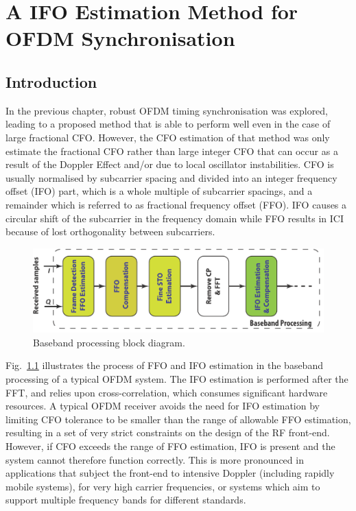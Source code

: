 \chapter{A IFO Estimation Method for OFDM Synchronisation}
\label{chap:CFO}

\section{Introduction}
In the previous chapter, robust OFDM timing synchronisation was explored, leading to a proposed method that is able to perform well even in the case of large fractional CFO.
However, the CFO estimation of that method was only estimate the fractional CFO rather than large integer CFO that can occur as a result of the Doppler Effect and/or due to local oscillator instabilities.
CFO is usually normalised by subcarrier spacing and divided into an integer frequency offset (IFO) part, which is a whole multiple of subcarrier spacings, and a remainder which is referred to as fractional frequency offset (FFO).
IFO causes a circular shift of the subcarrier in the frequency domain while FFO results in ICI because of lost orthogonality between subcarriers.
\begin{figure}[b]
    \centerline{\includegraphics [width=0.9\columnwidth] {figures/Baseband.pdf} }
    \caption{Baseband processing block diagram.}
    \label{fig:baseband}
\end{figure}
Fig.~\ref{fig:baseband} illustrates the process of FFO and IFO estimation in the baseband processing of a typical OFDM system.
The IFO estimation is performed after the FFT, and relies upon cross-correlation, which consumes significant hardware resources.
A typical OFDM receiver avoids the need for IFO estimation by limiting CFO tolerance to be smaller than the range of allowable FFO estimation, resulting in a set of very strict constraints on the design of the RF front-end. However, if CFO exceeds the range of FFO estimation, IFO is present and the system cannot therefore function correctly.
This is more pronounced in applications that subject the front-end to intensive Doppler (including rapidly mobile systems), for very high carrier frequencies, or systems which aim to support multiple frequency bands for different standards.

